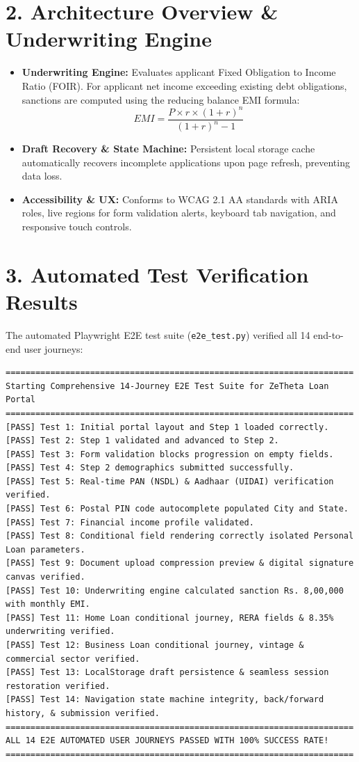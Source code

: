 \documentclass[11pt,a4paper]{article}
\begin{document}
\section{2. Architecture Overview \& Underwriting Engine}
\begin{itemize}[leftmargin=1.5em, itemsep=2pt]
    \item \textbf{Underwriting Engine:} Evaluates applicant Fixed Obligation to Income Ratio (FOIR). For applicant net income exceeding existing debt obligations, sanctions are computed using the reducing balance EMI formula:
    $$EMI = \frac{P \times r \times (1+r)^n}{(1+r)^n - 1}$$
    \item \textbf{Draft Recovery \& State Machine:} Persistent local storage cache automatically recovers incomplete applications upon page refresh, preventing data loss.
    \item \textbf{Accessibility \& UX:} Conforms to WCAG 2.1 AA standards with ARIA roles, live regions for form validation alerts, keyboard tab navigation, and responsive touch controls.
\end{itemize}

\section{3. Automated Test Verification Results}
The automated Playwright E2E test suite (\texttt{e2e\_test.py}) verified all 14 end-to-end user journeys:
\begin{lstlisting}
======================================================================
Starting Comprehensive 14-Journey E2E Test Suite for ZeTheta Loan Portal
======================================================================
[PASS] Test 1: Initial portal layout and Step 1 loaded correctly.
[PASS] Test 2: Step 1 validated and advanced to Step 2.
[PASS] Test 3: Form validation blocks progression on empty fields.
[PASS] Test 4: Step 2 demographics submitted successfully.
[PASS] Test 5: Real-time PAN (NSDL) & Aadhaar (UIDAI) verification verified.
[PASS] Test 6: Postal PIN code autocomplete populated City and State.
[PASS] Test 7: Financial income profile validated.
[PASS] Test 8: Conditional field rendering correctly isolated Personal Loan parameters.
[PASS] Test 9: Document upload compression preview & digital signature canvas verified.
[PASS] Test 10: Underwriting engine calculated sanction Rs. 8,00,000 with monthly EMI.
[PASS] Test 11: Home Loan conditional journey, RERA fields & 8.35% underwriting verified.
[PASS] Test 12: Business Loan conditional journey, vintage & commercial sector verified.
[PASS] Test 13: LocalStorage draft persistence & seamless session restoration verified.
[PASS] Test 14: Navigation state machine integrity, back/forward history, & submission verified.
======================================================================
ALL 14 E2E AUTOMATED USER JOURNEYS PASSED WITH 100% SUCCESS RATE!
======================================================================
\end{lstlisting}
\end{document}
